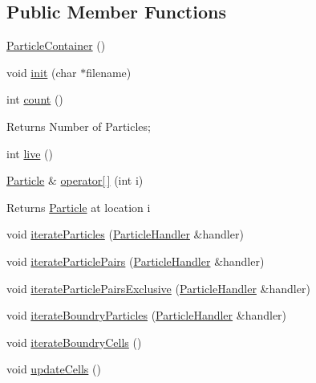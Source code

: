 \subsection*{Public Member Functions}
\begin{DoxyCompactItemize}
\item 
\hyperlink{classSimulation_1_1ParticleContainer_a6cbb30163cc128858fa33534b1c79a74}{Particle\-Container} ()
\item 
void \hyperlink{classSimulation_1_1ParticleContainer_a2bdf40eb2fab6e85afddf69d6ef43f27}{init} (char $\ast$filename)
\item 
int \hyperlink{classSimulation_1_1ParticleContainer_a8a7a0979f6d714977491fe14529004ee}{count} ()
\begin{DoxyCompactList}\small\item\em \begin{DoxyReturn}{Returns}
Number of Particles; 
\end{DoxyReturn}
\end{DoxyCompactList}\item 
int \hyperlink{classSimulation_1_1ParticleContainer_ab9aae4bb1525dc6d27592ebfc0dfd0d9}{live} ()
\item 
\hyperlink{classSimulation_1_1Particle}{Particle} \& \hyperlink{classSimulation_1_1ParticleContainer_a691b50db5c7d2fce6d2576c0b51b4ea9}{operator\mbox{[}$\,$\mbox{]}} (int i)
\begin{DoxyCompactList}\small\item\em \begin{DoxyReturn}{Returns}
\hyperlink{classSimulation_1_1Particle}{Particle} at location i 
\end{DoxyReturn}
\end{DoxyCompactList}\item 
void \hyperlink{classSimulation_1_1ParticleContainer_a13b3ada63172c5070e81235bc16801ca}{iterate\-Particles} (\hyperlink{classSimulation_1_1ParticleHandler}{Particle\-Handler} \&handler)
\item 
void \hyperlink{classSimulation_1_1ParticleContainer_a2d7f15f3d5cb18cd08dadc8f01f2e04a}{iterate\-Particle\-Pairs} (\hyperlink{classSimulation_1_1ParticleHandler}{Particle\-Handler} \&handler)
\item 
void \hyperlink{classSimulation_1_1ParticleContainer_ab70a9d544a8428d7085863990bca1811}{iterate\-Particle\-Pairs\-Exclusive} (\hyperlink{classSimulation_1_1ParticleHandler}{Particle\-Handler} \&handler)
\item 
void \hyperlink{classSimulation_1_1ParticleContainer_aaa04de698586200976d6530e8fa37005}{iterate\-Boundry\-Particles} (\hyperlink{classSimulation_1_1ParticleHandler}{Particle\-Handler} \&handler)
\item 
void \hyperlink{classSimulation_1_1ParticleContainer_a037e66a27f55a9bacec458a1c7925266}{iterate\-Boundry\-Cells} ()
\item 
void \hyperlink{classSimulation_1_1ParticleContainer_af3b7b2d3c26a67a390857a8aa0c8b31b}{update\-Cells} ()
\end{DoxyCompactItemize}
